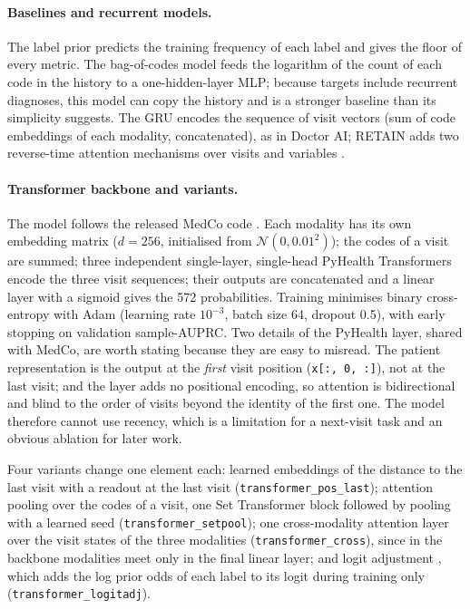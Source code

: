 \documentclass[11pt]{article}
\begin{document}
\begin{table}[H]
\centering\footnotesize

\caption{The 21 models of the benchmark. ``Block appl.'': number of Transformer block applications per modality
(the compute of the Transformer part, at equal width).}
\label{tab:models}
\end{table}

\paragraph{Baselines and recurrent models.} The label prior predicts the training frequency of each label and gives
the floor of every metric. The bag-of-codes model feeds the logarithm of the count of each code in the history to
a one-hidden-layer MLP; because targets include recurrent diagnoses, this model can copy the history and is a
stronger baseline than its simplicity suggests. The GRU encodes the sequence of visit vectors (sum of code
embeddings of each modality, concatenated), as in Doctor AI; RETAIN adds two reverse-time attention mechanisms over
visits and variables \citep{choi2016retain}.

\paragraph{Transformer backbone and variants.}
The model follows the released MedCo code \citep{medco2026}. Each modality has its own
embedding matrix ($d=256$, initialised from $\mathcal N(0,0.01^2)$); the codes of a visit are summed; three
independent single-layer, single-head PyHealth Transformers encode the three visit sequences; their outputs are
concatenated and a linear layer with a sigmoid gives the 572 probabilities. Training minimises binary
cross-entropy with Adam (learning rate $10^{-3}$, batch size 64, dropout 0.5), with early stopping on validation
sample-AUPRC. Two details of the PyHealth layer, shared with MedCo, are worth stating because they are easy to
misread. The patient representation is the output at the \emph{first} visit position (\texttt{x[:, 0, :]}),
not at the last visit; and the layer adds no positional encoding, so attention is bidirectional and blind to
the order of visits beyond the identity of the first one. The model therefore cannot use recency, which is a
limitation for a next-visit task and an obvious ablation for later work.


Four variants change one element each: learned embeddings of the distance to the last visit with a readout at the
last visit (\texttt{transformer\_pos\_last}); attention pooling over the codes of a visit, one Set Transformer block
followed by pooling with a learned seed \citep{lee2019settransformer} (\texttt{transformer\_setpool}); one
cross-modality attention layer over the visit states of the three modalities (\texttt{transformer\_cross}), since in
the backbone modalities meet only in the final linear layer; and logit adjustment
\citep{menon2021logit}, which adds the log prior odds of each label to its logit during training only
(\texttt{transformer\_logitadj}).
\end{document}
